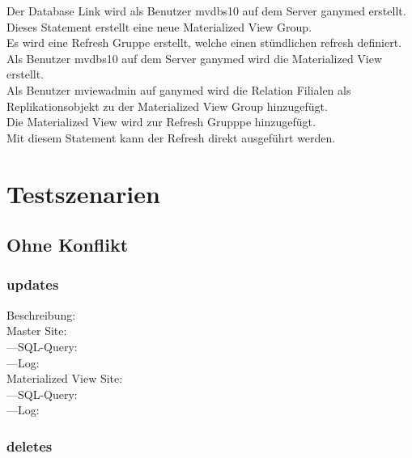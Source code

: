 \documentclass[11pt,a4paper,parskip=half]{scrartcl}
\begin{document}

Der Database Link wird als Benutzer mvdbs10 auf dem Server ganymed erstellt.\\


Dieses Statement erstellt eine neue Materialized View Group.\\


Es wird eine Refresh Gruppe erstellt, welche einen stündlichen refresh definiert.\\


Als Benutzer mvdbs10 auf dem Server ganymed wird die Materialized View erstellt.\\


Als Benutzer mviewadmin auf ganymed wird die Relation Filialen als Replikationsobjekt zu der Materialized View Group hinzugefügt.\\


Die Materialized View wird zur Refresh Grupppe hinzugefügt.\\


Mit diesem Statement kann der Refresh direkt ausgeführt werden.\\

\section{Testszenarien}
\subsection{Ohne Konflikt}
\subsubsection{updates}
Beschreibung:\\
Master Site:\\
	---SQL-Query:\\
	---Log:\\
Materialized View Site:\\
	---SQL-Query:\\
	---Log:\\
\subsubsection{deletes}
\end{document}
